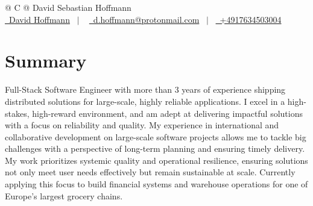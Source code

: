 \documentclass[a4paper,13pt]{article}
\begin{document}
\pagestyle{empty} 



\begin{tabularx}{\linewidth}{@{} C @{}}
\Huge{David Sebastian Hoffmann} \\[7.5pt]
\vspace{0pt}
\href{https://linkedin.com/in/david-hoffmann-b7b51b228}{\raisebox{-0.05\height}\faLinkedin\ David Hoffmann} \ $|$ \ 
\href{mailto:d.hoffmann@protonmail.com}{\raisebox{-0.05\height}\faEnvelope \ d.hoffmann@protonmail.com} \ $|$ \ 
\href{tel:+4917634503004}{\raisebox{-0.05\height}\faMobile \ +4917634503004} \\
\end{tabularx}


\vspace{10pt}
\section{Summary}
Full-Stack Software Engineer with more than 3 years of experience shipping distributed solutions for large-scale, highly reliable applications.
I excel in a high-stakes, high-reward environment, and am adept at delivering impactful solutions with a focus on reliability and quality. My experience in international and collaborative development on large-scale software projects allows me to tackle big challenges with a perspective of long-term planning and ensuring timely delivery. 
My work prioritizes systemic quality and operational resilience, ensuring solutions not only meet user needs effectively but remain sustainable at scale. Currently applying this focus to build financial systems and warehouse operations for one of Europe's largest grocery chains.
\vspace{10pt}
\end{document}
